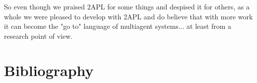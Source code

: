 \documentclass[a4paper]{article}
\begin{document}
So even though we praised 2APL for some things and despised it for others, as a whole we were pleased to develop with 2APL and do believe that with more work it can become the "go to" language of multiagent systems... at least from a research point of view.


\section{Bibliography}
\nocite{*}


\end{document}
